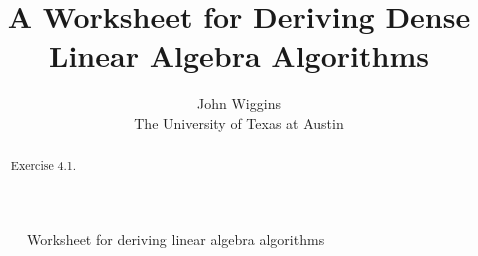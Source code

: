 \documentclass{article}
\title{
A Worksheet for Deriving
Dense Linear Algebra Algorithms
}
\author{
John Wiggins \\
The University of Texas at Austin
}
\begin{document}
            
\maketitle

\begin{abstract} 
Exercise 4.1.
\end{abstract}
            

\resetsteps

\begin{figure}[tbp]
\begin{center}
\worksheet
\end{center}
\caption{Worksheet for deriving linear algebra algorithms}
\end{figure}

\renewcommand{\operation}{B \becomes L^{-1} B}



\renewcommand{\precondition}{B = \hat{B} \wedge \cdots }


\renewcommand{\postcondition}{{ B = L^{-1} \hat{B} }}


\renewcommand{\invariant}{
\FlaTwoByOne{ B_T }
            { B_B } 
= 
\FlaTwoByOne{ L_{TL}^{-1} \hat{B}_T }
            { \hat{B}_B - L_{BL} L_{TL}^{-1} \hat{B}_T }
}


\renewcommand{\guard}{ \neg \SameSize( L_{TL}, L ) }


\renewcommand{\partitionings}{
$
L \rightarrow
\FlaTwoByTwo{ L_{TL} } { 0 }
              { L_{BL} } { L_{BR}   }
$,
$
B \rightarrow 
\FlaTwoByOne{ B_T }
            { B_B }
$ and
$
\hat{B} \rightarrow 
\FlaTwoByOne{ \hat{B}_T }
            { \hat{B}_B }
$
}


\renewcommand{\partitionsizes}{$ L_{TL} $ is $ 0 \times 0 $, and ... }




\renewcommand{\repartitionings}{ 
\normalsize
$
\FlaTwoByTwo{ L_{TL} } { 0 }
              { L_{BL} } { L_{BR}   } \rightarrow
\FlaThreeByThreeBR{ L_{00} }{ 0 }{ 0 }
              { L_{10} }{ L_{11} }{ 0 }
              { L_{20} }{ L_{21} }{ L_{22} }
$,
$
\FlaTwoByOne{ B_T }
            { B_B }
\rightarrow
\FlaThreeByOneB{ B_0 }
               { B_1 }
               { B_2 }
$, and \\
$
\FlaTwoByOne{ \hat{B}_T }
            { \hat{B}_B }
\rightarrow
\FlaThreeByOneB{ \hat{B}_0 }
               { \hat{B}_1 }
               { \hat{B}_2 }
$
}




\renewcommand{\repartitionsizes}{
$ B_1 $ and $ \hat{B}_1 $ are columns and $ L_{11} $ is a matrix}
\end{document}
